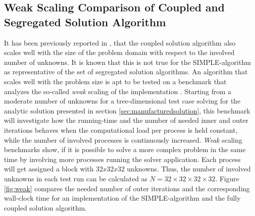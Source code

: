 \subsection{Weak Scaling Comparison of Coupled and Segregated Solution Algorithm}
\label{sec:weakscaling}

It has been previously reported in \cite{darwish09,vakilipour12}, that the coupled solution algorithm also scales well with the size of the problem domain with respect to the involved number of unknowns. It is known that this is not true for the SIMPLE-algorithm as representative of the set of segregated solution algorithms. An algorithm that scales well with the problem size is apt to be tested on a benchmark that analyzes the so-called \emph{weak} scaling of the implementation \cite{hager11}. Starting from a moderate number of unknowns for a tree-dimensional test case solving for the analytic solution presented in section \ref{sec:manufacturedsolution}, this benchmark will investigate how the running-time and the number of needed inner and outer iterations behaves when the computational load per process is held constant, while the number of involved processes is continuously increased. \emph{Weak} scaling benchmarks show, if it is possible to solve a more complex problem in the same time by involving more processes running the solver application. Each process will get assigned a block with \(32x32x32\) unknowns. Thus, the number of involved unknowns in each test run can be calculated as \( N = 32\times32\times32\times32 \). Figure \ref{fig:weak} compares the needed number of outer iterations and the corresponding wall-clock time for an implementation of the SIMPLE-algorithm and the fully coupled solution algorithm.

